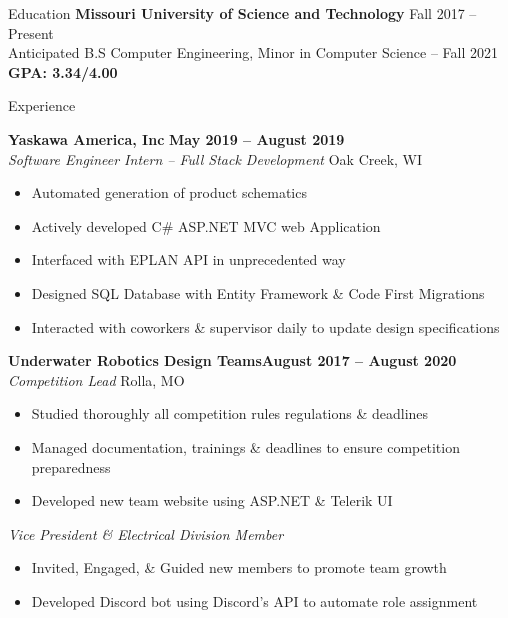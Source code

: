 \documentclass{resume}
\begin{document}


\begin{rSection}{Education}
    \small
    {
        {\bf Missouri University of Science and Technology} \hfill {Fall 2017 -- Present}
        \\Anticipated B.S Computer Engineering, Minor in Computer Science -- Fall 2021 \hfill {\bf GPA: 3.34/4.00}
    }
\end{rSection}

\begin{rSection}{Experience}
\small
{
    {\bf Yaskawa America, Inc} \hfill {\bf May 2019 -- August 2019}\\
    \emph{Software Engineer Intern – Full Stack Development}
     \hfill {Oak Creek, WI}
     \begin{itemize}
        \item {Automated generation of product schematics}
        \item {Actively developed C\# ASP.NET MVC web Application}
        \item {Interfaced with EPLAN API in unprecedented way}
        \item {Designed SQL Database with Entity Framework \& Code First Migrations}
        \item {Interacted with coworkers \& supervisor daily to update design specifications}
    \end{itemize}

    {\bf Underwater Robotics Design Teams}\hfill {\bf August 2017 -- August 2020}\\
    \emph{Competition Lead}
     \hfill {Rolla, MO}
     \begin{itemize}
        \item {Studied thoroughly all competition rules regulations \& deadlines}
        \item {Managed documentation, trainings \& deadlines to ensure competition preparedness}
        \item {Developed new team website using ASP.NET \& Telerik UI}
    \end{itemize}
    \emph{Vice President \& Electrical Division Member}
    \begin{itemize}
        \item {Invited, Engaged, \& Guided new members to promote team growth}
        \item {Developed Discord bot using Discord's API to automate role assignment}
    \end{itemize}

}
\end{rSection}
\end{document}
